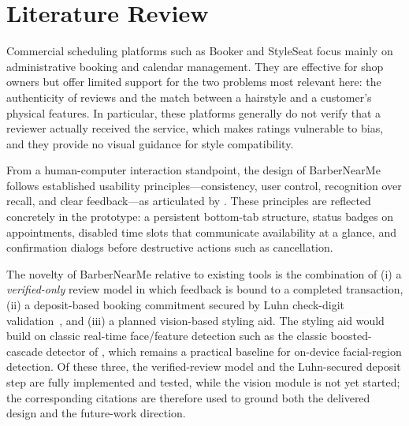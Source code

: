 \documentclass[14pt]{article}
\begin{document}
\section{Literature Review}
\label{sec:lit}
Commercial scheduling platforms such as Booker and StyleSeat focus mainly
on administrative booking and calendar management. They are effective for
shop owners but offer limited support for the two problems most relevant
here: the authenticity of reviews and the match between a hairstyle and a
customer's physical features. In particular, these platforms generally do
not verify that a reviewer actually received the service, which makes
ratings vulnerable to bias, and they provide no visual guidance for style
compatibility.

From a human-computer interaction standpoint, the design of BarberNearMe
follows established usability principles---consistency, user control,
recognition over recall, and clear feedback---as articulated by
\citet{shneiderman2016designing}. These
principles are reflected concretely in the prototype: a persistent
bottom-tab structure, status badges on appointments, disabled time slots
that communicate availability at a glance, and confirmation dialogs
before destructive actions such as cancellation.

The novelty of BarberNearMe relative to existing tools is the combination
of (i) a \emph{verified-only} review model in which feedback is bound to
a completed transaction, (ii) a deposit-based booking commitment secured
by Luhn check-digit validation~\citep{luhn1960verifying}, and (iii) a
planned vision-based styling aid. The styling aid would build on classic
real-time face/feature detection such as the classic boosted-cascade
detector of \citet{viola2001rapid}, which remains a practical baseline for
on-device facial-region detection. Of these three, the verified-review
model and the Luhn-secured deposit step are fully implemented and
tested, while the vision module is not yet started; the corresponding
citations are therefore used to ground both the delivered design and the
future-work direction.

\end{document}
